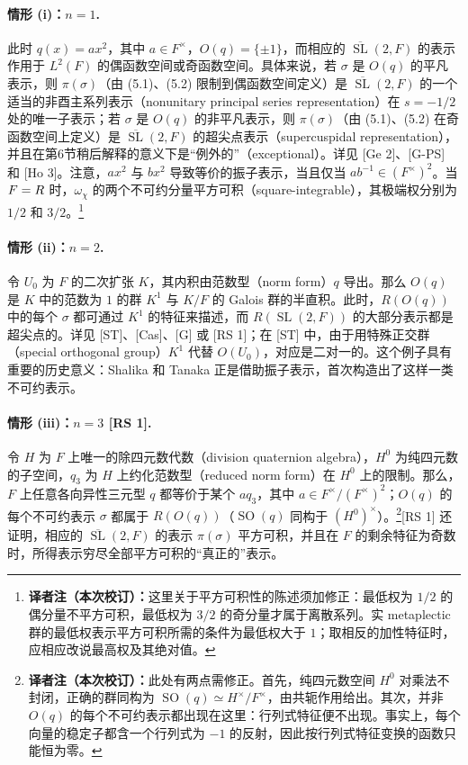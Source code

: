 \paragraph*{情形 (i)：$n=1$.}
此时 $q(x)=ax^2$，其中 $a\in F^\times$，$O(q)=\{\pm1\}$，而相应的 $\overline{\operatorname{SL}}(2,F)$ 的表示作用于 $L^2(F)$ 的偶函数空间或奇函数空间。具体来说，若 $\sigma$ 是 $O(q)$ 的平凡表示，则 $\pi(\sigma)$（由 (5.1)、(5.2) 限制到偶函数空间定义）是 $\overline{\operatorname{SL}}(2,F)$ 的一个适当的非酉主系列表示（nonunitary principal series representation）在 $s=-1/2$ 处的唯一子表示；若 $\sigma$ 是 $O(q)$ 的非平凡表示，则 $\pi(\sigma)$（由 (5.1)、(5.2) 在奇函数空间上定义）是 $\overline{\operatorname{SL}}(2,F)$ 的超尖点表示（supercuspidal representation），并且在第6节稍后解释的意义下是“例外的”（exceptional）。详见 [Ge 2]、[G-PS] 和 [Ho 3]。注意，$ax^2$ 与 $bx^2$ 导致等价的振子表示，当且仅当 $ab^{-1}\in(F^\times)^2$。当 $F=R$ 时，$\omega_\chi$ 的两个不可约分量平方可积（square-integrable），其极端权分别为 $1/2$ 和 $3/2$。\footnote{\textbf{译者注（本次校订）：}这里关于平方可积性的陈述须加修正：最低权为 $1/2$ 的偶分量不平方可积，最低权为 $3/2$ 的奇分量才属于离散系列。实 metaplectic 群的最低权表示平方可积所需的条件为最低权大于 $1$；取相反的加性特征时，应相应改说最高权及其绝对值。}

\paragraph*{情形 (ii)：$n=2$.}
令 $U_0$ 为 $F$ 的二次扩张 $K$，其内积由范数型（norm form）$q$ 导出。那么 $O(q)$ 是 $K$ 中的范数为 $1$ 的群 $K^1$ 与 $K/F$ 的 Galois 群的半直积。此时，$R(O(q))$ 中的每个 $\sigma$ 都可通过 $K^1$ 的特征来描述，而 $R(\operatorname{SL}(2,F))$ 的大部分表示都是超尖点的。详见 [ST]、[Cas]、[G] 或 [RS 1]；在 [ST] 中，由于用特殊正交群（special orthogonal group）$K^1$ 代替 $O(U_0)$，对应是二对一的。这个例子具有重要的历史意义：Shalika 和 Tanaka 正是借助振子表示，首次构造出了这样一类不可约表示。

\paragraph*{情形 (iii)：$n=3$ [RS 1].}
令 $H$ 为 $F$ 上唯一的除四元数代数（division quaternion algebra），$H^0$ 为纯四元数的子空间，$q_3$ 为 $H$ 上约化范数型（reduced norm form）在 $H^0$ 上的限制。那么，$F$ 上任意各向异性三元型 $q$ 都等价于某个 $aq_3$，其中 $a\in F^\times/(F^\times)^2$；$O(q)$ 的每个不可约表示 $\sigma$ 都属于 $R(O(q))$（$\operatorname{SO}(q)$ 同构于 $(H^0)^\times$）。\footnote{\textbf{译者注（本次校订）：}此处有两点需修正。首先，纯四元数空间 $H^0$ 对乘法不封闭，正确的群同构为 $\operatorname{SO}(q)\simeq H^\times/F^\times$，由共轭作用给出。其次，并非 $O(q)$ 的每个不可约表示都出现在这里：行列式特征便不出现。事实上，每个向量的稳定子都含一个行列式为 $-1$ 的反射，因此按行列式特征变换的函数只能恒为零。}[RS 1] 还证明，相应的 $\overline{\operatorname{SL}}(2,F)$ 的表示 $\pi(\sigma)$ 平方可积，并且在 $F$ 的剩余特征为奇数时，所得表示穷尽全部平方可积的“真正的”表示。

